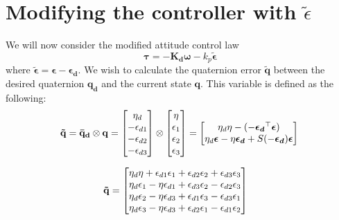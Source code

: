 \section{Modifying the controller with $\tilde{\epsilon}$}
We will now consider the modified attitude control law
\begin{equation*}
    \boldsymbol{\tau} = -\mathbf{K_d} \boldsymbol{\omega} - k_p \tilde{\boldsymbol{\epsilon}}
\end{equation*}
where $\tilde{\boldsymbol{\epsilon}} = \boldsymbol{\epsilon} - \boldsymbol{\epsilon_d}$.
We wish to calculate the quaternion error $\mathbf{\tilde{q}}$ between the desired quaternion $\mathbf{q_d}$ and the current state $\mathbf{q}$. This variable is defined as the following: 
\begin{equation*}
    \mathbf{\tilde{q}} ={\mathbf{ \bar q_d}} \otimes \mathbf{q} 
    = \begin{bmatrix}\eta_d \\ -\epsilon_{d1} \\ -\epsilon_{d2} \\ -\epsilon_{d3}\end{bmatrix} \otimes 
      \begin{bmatrix}\eta \\ \epsilon_1 \\ \epsilon_2 \\ \epsilon_3\end{bmatrix}
    = \begin{bmatrix}  \eta_d\eta - (-\boldsymbol{\epsilon_d}^\top \boldsymbol{\epsilon})\\
            \eta_d \boldsymbol{\epsilon} - \eta\boldsymbol{\epsilon_d} + S(-\boldsymbol{\epsilon_d})\boldsymbol{\epsilon}\end{bmatrix} \\
\end{equation*}




\begin{equation*}
    \begin{split}
        \mathbf{\tilde{q}} &= 
        \begin{bmatrix}\eta_d \eta +\epsilon_{d1} \epsilon_1+ \epsilon_{d2} \epsilon_2+\epsilon_{d3} \epsilon_3 \\
           \eta_d \epsilon_1 - \eta \epsilon_{d1} + \epsilon_{d3} \epsilon_2 - \epsilon_{d2} \epsilon_3 \\
           \eta_d \epsilon_2 - \eta \epsilon_{d3} + \epsilon_{d1} \epsilon_3 - \epsilon_{d3} \epsilon_1  \\
           \eta_d \epsilon_3 - \eta \epsilon_{d3} + \epsilon_{d2} \epsilon_1 - \epsilon_{d1} \epsilon_2 \end{bmatrix}
    \end{split}
\end{equation*}

